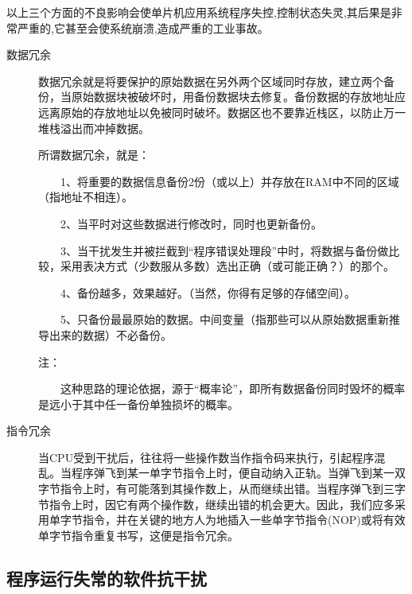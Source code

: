 以上三个方面的不良影响会使单片机应用系统程序失控,控制状态失灵,其后果是非常严重的,它甚至会使系统崩溃,造成严重的工业事故。

\begin{description}
  \item[数据冗余]     数据冗余就是将要保护的原始数据在另外两个区域同时存放，建立两个备份，当原始数据块被破坏时，用备份数据块去修复。备份数据的存放地址应远离原始的存放地址以免被同时破坏。数据区也不要靠近栈区，以防止万一堆栈溢出而冲掉数据。
\begin{remark}
  所谓数据冗余，就是：

　　1、将重要的数据信息备份2份（或以上）并存放在RAM中不同的区域（指地址不相连）。

　　2、当平时对这些数据进行修改时，同时也更新备份。

　　3、当干扰发生并被拦截到“程序错误处理段”中时，将数据与备份做比较，采用表决方式（少数服从多数）选出正确（或可能正确？）的那个。

　　4、备份越多，效果越好。（当然，你得有足够的存储空间）。

　　5、只备份最最原始的数据。中间变量（指那些可以从原始数据重新推导出来的数据）不必备份。

注：

　　这种思路的理论依据，源于“概率论”，即所有数据备份同时毁坏的概率是远小于其中任一备份单独损坏的概率。
\end{remark}
  \item[指令冗余]    当CPU受到干扰后，往往将一些操作数当作指令码来执行，引起程序混乱。当程序弹飞到某一单字节指令上时，便自动纳入正轨。当弹飞到某一双字节指令上时，有可能落到其操作数上，从而继续出错。当程序弹飞到三字节指令上时，因它有两个操作数，继续出错的机会更大。因此，我们应多采用单字节指令，并在关键的地方人为地插入一些单字节指令(NOP)或将有效单字节指令重复书写，这便是指令冗余。

\end{description}


\subsection{程序运行失常的软件抗干扰}

